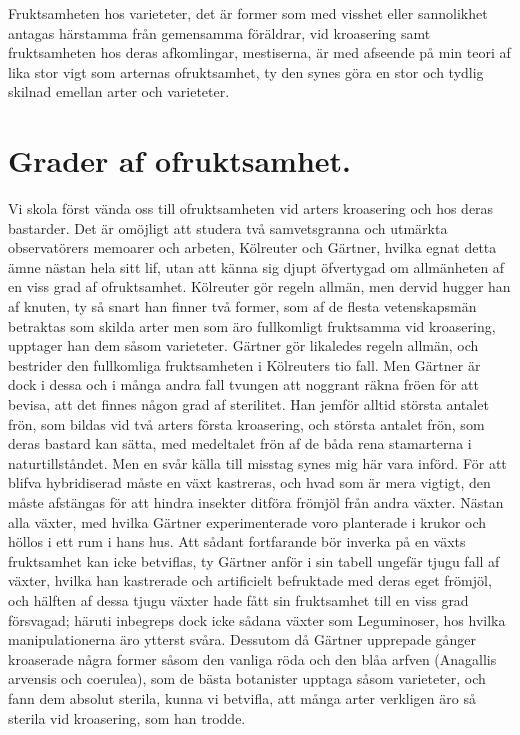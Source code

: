 Fruktsamheten hos varieteter, det är former som med visshet eller sannolikhet antagas härstamma från gemensamma föräldrar, vid kroasering samt fruktsamheten hos deras afkomlingar, mestiserna, är med afseende på min teori af lika stor vigt som arternas ofruktsamhet, ty den synes göra en stor och tydlig skilnad emellan arter och varieteter.



\section{Grader af ofruktsamhet.}

Vi skola först vända oss till ofruktsamheten vid arters kroasering och hos deras bastarder. Det är omöjligt att studera två samvetsgranna och utmärkta observatörers memoarer och arbeten, Kölreuter och Gärtner, hvilka egnat detta ämne nästan hela sitt lif, utan att känna sig djupt öfvertygad om allmänheten af en viss grad af ofruktsamhet. Kölreuter gör regeln allmän, men dervid hugger han af knuten, ty så snart han finner två former, som af de flesta vetenskapsmän betraktas som skilda arter men som äro fullkomligt fruktsamma vid kroasering, upptager han dem såsom varieteter. Gärtner gör likaledes regeln allmän, och bestrider den fullkomliga fruktsamheten i Kölreuters tio fall. Men Gärtner är dock i dessa och i många andra fall tvungen att noggrant räkna fröen för att bevisa, att det finnes någon grad af sterilitet. Han jemför alltid största antalet frön, som bildas vid två arters första kroasering, och största antalet frön, som deras bastard kan sätta, med medeltalet frön af de båda rena stamarterna i naturtillståndet. Men en svår källa till misstag synes mig här vara införd. För att blifva hybridiserad måste en växt kastreras, och hvad som är mera vigtigt, den måste afstängas för att hindra insekter ditföra frömjöl från andra växter. Nästan alla växter, med hvilka Gärtner experimenterade voro planterade i krukor och höllos i ett rum i hans hus. Att sådant fortfarande bör inverka på en växts fruktsamhet kan icke betviflas, ty Gärtner anför i sin tabell ungefär tjugu fall af växter, hvilka han kastrerade och artificielt befruktade med deras eget frömjöl, och hälften af dessa tjugu växter hade fått sin fruktsamhet till en viss grad försvagad; häruti inbegreps dock icke sådana växter som Leguminoser, hos hvilka manipulationerna äro ytterst svåra. Dessutom då Gärtner upprepade gånger kroaserade några former såsom den vanliga röda och den blåa arfven (Anagallis arvensis och coerulea), som de bästa botanister upptaga såsom varieteter, och fann dem absolut sterila, kunna vi betvifla, att många arter verkligen äro så sterila vid kroasering, som han trodde.

